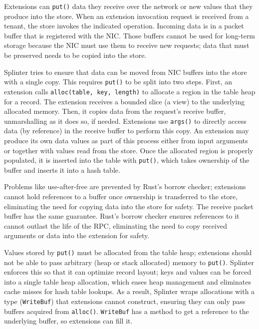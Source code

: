 Extensions can \texttt{put()} data they receive over the network
  or new values that they produce into the store.
When an extension invocation request is received from a tenant, the store invokes the indicated operation.
Incoming data is in a packet buffer that is registered with the NIC.
Those buffers cannot be used for long-term storage
  because the NIC must use them to receive new requests;
data that must be preserved needs to be copied into the store.

Splinter tries to ensure that data can be moved from NIC buffers into the
    store with a single copy.
This requires \texttt{put()} to be split into two steps.
First, an extension calls \texttt{alloc(table, key, length)} to allocate a region in
  the table heap for a record.
The extension receives a bounded slice (a view) to the underlying allocated
  memory.
Then, it copies data from the request's receive buffer, unmarshalling
    as it does so, if needed.
Extensions use \texttt{args()} to directly access data (by
  reference) in the receive buffer to perform this copy.
An extension may produce its own data values as part of this process
    either from input arguments or together with values read from the store.
Once the allocated region is properly populated, it is inserted into the
  table with \texttt{put()},
which takes ownership of the buffer and inserts it into a hash table.

Problems like use-after-free are prevented by Rust's borrow checker;
extensions cannot hold references to a buffer once ownership is
  transferred to the store, eliminating the need for copying data into the
  store for safety.
The receive packet buffer has the same guarantee.
Rust's borrow checker ensures references to it cannot outlast
  the life of the RPC, eliminating the need to copy
  received arguments or data into the extension for safety.

Values stored by \texttt{put()} must be allocated from the table heap;
  extensions should not be able to pass arbitrary (heap or stack allocated)
  memory to \texttt{put()}.
Splinter enforces this so that it can optimize record layout;
keys and values can be forced into a single table heap allocation, which
  eases heap management and eliminates cache misses for hash table lookups.
As a result, Splinter wraps allocations
  with a type (\texttt{WriteBuf}) that extensions cannot construct,
  ensuring they can
  only pass buffers acquired from \texttt{alloc()}.
\texttt{WriteBuf} has a method to get a reference to the
  underlying buffer, so extensions can fill it.

